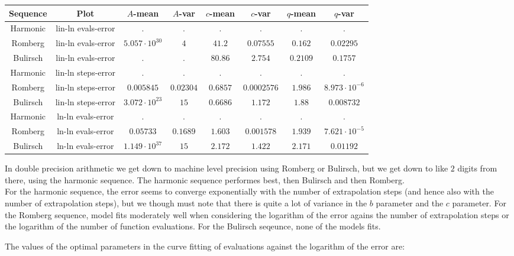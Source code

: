 \begin{table}[H]
    \centering
    \small
    \begin{tabular}{c|c||c|c|c|c|c	|c}
Sequence & Plot & \(A\)-mean & \(A\)-var & \(c\)-mean & \(c\)-var & \(q\)-mean & \(q\)-var\\\hline
Harmonic & lin-ln evals-error & . & . & . & . & . & . \\
Romberg & lin-ln evals-error & \(5.057\cdot 10^{30}\) & \(4\) & \(41.2\) & \(0.07555\) & \(0.162\) & \(0.02295\) \\
Bulirsch & lin-ln evals-error & . & . & \(80.86\) & \(2.754\) & \(0.2109\) & \(0.1757\) \\
Harmonic & lin-ln steps-error & . & . & . & . & . & . \\
Romberg & lin-ln steps-error & \(0.005845\) & \(0.02304\) & \(0.6857\) & \(0.0002576\) & \(1.986\) & \(8.973\cdot 10^{-6}\) \\
Bulirsch & lin-ln steps-error & \(3.072\cdot 10^{23}\) & \(15\) & \(0.6686\) & \(1.172\) & \(1.88\) & \(0.008732\) \\
Harmonic & ln-ln evals-error & . & . & . & . & . & . \\
Romberg & ln-ln evals-error & \(0.05733\) & \(0.1689\) & \(1.603\) & \(0.001578\) & \(1.939\) & \(7.621\cdot 10^{-5}\) \\
Bulirsch & ln-ln evals-error & \(1.149\cdot 10^{37}\) & \(15\) & \(2.172\) & \(1.422\) & \(2.171\) & \(0.01192\) \\
    \end{tabular}
    \label{tab:my_label}
\end{table}

In double precision arithmetic we get down to machine level precision using Romberg or Bulirsch, but we get down to like \(2\) digits from there, using the harmonic sequence. The harmonic sequence performes best, then Bulirsch and then Romberg.\\

For the harmonic sequence, the error seems to converge exponentially with the number of extrapolation steps (and hence also with the number of extrapolation steps), but we though must note that there is quite a lot of variance in the \(b\) parameter and the \(c\) parameter. For the Romberg sequence, model fits moderately well when considering the logarithm of the error agains the number of extrapolation steps or the logarithm of the number of function evaluations. For the Bulirsch seqeunce, none of the models fits.

The values of the optimal parameters in the curve fitting of evaluations against the logarithm of the error are:

